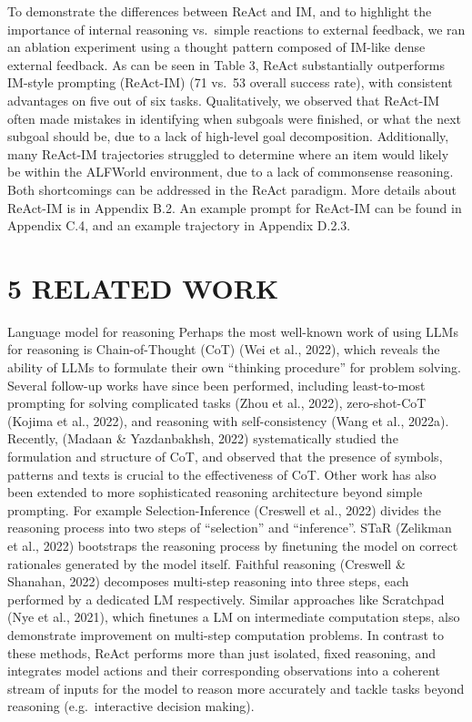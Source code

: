 \documentclass[
]{article}
\begin{document}
To demonstrate the differences between ReAct and IM, and to highlight
the importance of internal reasoning vs.~simple reactions to external
feedback, we ran an ablation experiment using a thought pattern composed
of IM-like dense external feedback. As can be seen in Table 3, ReAct
substantially outperforms IM-style prompting (ReAct-IM) (71 vs.~53
overall success rate), with consistent advantages on five out of six
tasks. Qualitatively, we observed that ReAct-IM often made mistakes in
identifying when subgoals were finished, or what the next subgoal should
be, due to a lack of high-level goal decomposition. Additionally, many
ReAct-IM trajectories struggled to determine where an item would likely
be within the ALFWorld environment, due to a lack of commonsense
reasoning. Both shortcomings can be addressed in the ReAct paradigm.
More details about ReAct-IM is in Appendix B.2. An example prompt for
ReAct-IM can be found in Appendix C.4, and an example trajectory in
Appendix D.2.3.

\section{5 RELATED WORK}\label{related-work}

Language model for reasoning Perhaps the most well-known work of using
LLMs for reasoning is Chain-of-Thought (CoT) (Wei et al., 2022), which
reveals the ability of LLMs to formulate their own ``thinking
procedure'' for problem solving. Several follow-up works have since been
performed, including least-to-most prompting for solving complicated
tasks (Zhou et al., 2022), zero-shot-CoT (Kojima et al., 2022), and
reasoning with self-consistency (Wang et al., 2022a). Recently, (Madaan
\& Yazdanbakhsh, 2022) systematically studied the formulation and
structure of CoT, and observed that the presence of symbols, patterns
and texts is crucial to the effectiveness of CoT. Other work has also
been extended to more sophisticated reasoning architecture beyond simple
prompting. For example Selection-Inference (Creswell et al., 2022)
divides the reasoning process into two steps of ``selection'' and
``inference''. STaR (Zelikman et al., 2022) bootstraps the reasoning
process by finetuning the model on correct rationales generated by the
model itself. Faithful reasoning (Creswell \& Shanahan, 2022) decomposes
multi-step reasoning into three steps, each performed by a dedicated LM
respectively. Similar approaches like Scratchpad (Nye et al., 2021),
which finetunes a LM on intermediate computation steps, also demonstrate
improvement on multi-step computation problems. In contrast to these
methods, ReAct performs more than just isolated, fixed reasoning, and
integrates model actions and their corresponding observations into a
coherent stream of inputs for the model to reason more accurately and
tackle tasks beyond reasoning (e.g.~interactive decision making).
\end{document}
